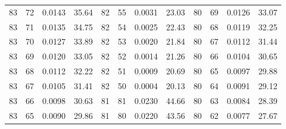 \begin{tabular}{llll|llll|llll}
83 & 72 & 0.0143 & 35.64 & 82 & 55 & 0.0031 & 23.03 & 80 & 69 & 0.0126 & 33.07\\
83 & 71 & 0.0135 & 34.75 & 82 & 54 & 0.0025 & 22.43 & 80 & 68 & 0.0119 & 32.25\\
83 & 70 & 0.0127 & 33.89 & 82 & 53 & 0.0020 & 21.84 & 80 & 67 & 0.0112 & 31.44\\
83 & 69 & 0.0120 & 33.05 & 82 & 52 & 0.0014 & 21.26 & 80 & 66 & 0.0104 & 30.65\\
83 & 68 & 0.0112 & 32.22 & 82 & 51 & 0.0009 & 20.69 & 80 & 65 & 0.0097 & 29.88\\
83 & 67 & 0.0105 & 31.41 & 82 & 50 & 0.0004 & 20.13 & 80 & 64 & 0.0091 & 29.12\\
83 & 66 & 0.0098 & 30.63 & 81 & 81 & 0.0230 & 44.66 & 80 & 63 & 0.0084 & 28.39\\
83 & 65 & 0.0090 & 29.86 & 81 & 80 & 0.0220 & 43.56 & 80 & 62 & 0.0077 & 27.67\\
\bottomrule
\end{tabular}
\newpage
